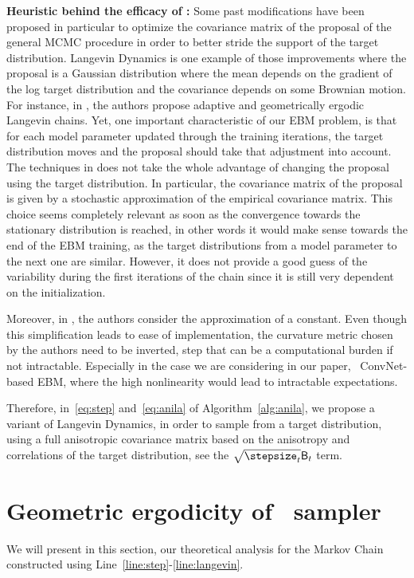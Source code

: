 \documentclass[letterpaper]{article} %
\begin{document}
\textbf{Heuristic behind the efficacy of \algo:}
Some past modifications have been proposed in particular to optimize the covariance matrix of the proposal of the general MCMC procedure in order to better stride the support of the target distribution. 
Langevin Dynamics is one example of those improvements where the proposal is a Gaussian distribution where the mean depends on the gradient of the log target distribution and the covariance depends on some Brownian motion.
For instance, in \cite{atchade2006adaptive,marshall2012adaptive}, the authors propose adaptive and geometrically ergodic Langevin chains. 
Yet, one important characteristic of our EBM problem, is that for each model parameter updated through the training iterations, the target distribution moves and the proposal should take that adjustment into account.
The techniques in \cite{atchade2006adaptive,marshall2012adaptive} does not take the whole advantage of changing the proposal using the target distribution. 
In particular, the covariance matrix of the proposal is given by a stochastic approximation of the empirical covariance matrix. 
This choice seems completely relevant as soon as the convergence towards the stationary distribution is reached, in other words it would make sense towards the end of the EBM training, as the target distributions from a model parameter to the next one are similar. 
However, it does not provide a good guess of the variability during the first iterations of the chain since it is still very dependent on the initialization. 

Moreover, in  \cite{girolami2011riemann}, the authors consider the approximation of a constant. Even though this simplification leads to ease of implementation, the curvature metric chosen by the authors need to be inverted, step that can be a computational burden if not intractable. 
Especially in the case we are considering in our paper, \ie\ ConvNet-based EBM, where the high nonlinearity would lead to intractable expectations.

Therefore, in~\eqref{eq:step} and~\eqref{eq:anila} of Algorithm~\ref{alg:anila}, we propose a variant of Langevin Dynamics, in order to sample from a target distribution, using a full anisotropic covariance matrix based on the anisotropy and correlations of the target distribution, see the $\sqrt{\stepsize_t} \mathsf{B}_t$ term. 


\section{Geometric ergodicity of \algo\ sampler}\label{sec:theory}
We will present in this section, our theoretical analysis for the Markov Chain constructed using Line~\ref{line:step}-\ref{line:langevin}. 
\end{document}
